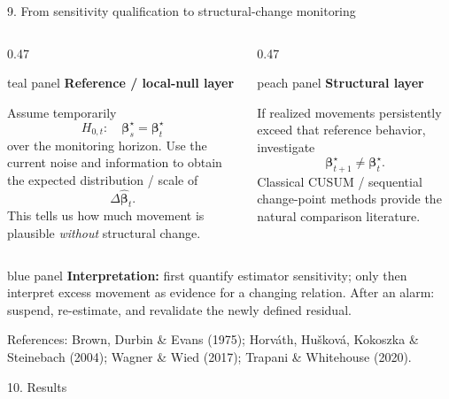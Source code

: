 \documentclass[aspectratio=169,10pt]{beamer}
\newenvironment{tealpanel}{\begin{beamercolorbox}[wd=\linewidth,sep=0.16cm,rounded=true]{teal panel}}{\end{beamercolorbox}}
\newenvironment{peachpanel}{\begin{beamercolorbox}[wd=\linewidth,sep=0.16cm,rounded=true]{peach panel}}{\end{beamercolorbox}}
\newenvironment{bluepanel}{\begin{beamercolorbox}[wd=\linewidth,sep=0.16cm,rounded=true]{blue panel}}{\end{beamercolorbox}}
\newcommand{\plotblank}[2][]{%
  \vspace{0.06cm}
  {\color{linegray}\setlength{\fboxsep}{0pt}\setlength{\fboxrule}{0.45pt}%
  \fbox{\parbox[c][#2][c]{0.985\linewidth}{\centering\color{linegray}\scriptsize #1}}}%
}
\begin{document}
\begin{frame}{9. From sensitivity qualification to structural-change monitoring}
\scriptsize
\begin{columns}[T,onlytextwidth]
\begin{column}{0.47\textwidth}
\begin{tealpanel}
\textbf{Reference / local-null layer}

Assume temporarily
\[
H_{0,t}:\quad \bm\beta_s^{\star}=\bm\beta_t^{\star}
\]
over the monitoring horizon. Use the current noise and information to obtain the expected distribution / scale of
\[
\Delta\hat{\bm\beta}_t.
\]
This tells us how much movement is plausible \emph{without} structural change.
\end{tealpanel}
\end{column}

\begin{column}{0.47\textwidth}
\begin{peachpanel}
\textbf{Structural layer}

If realized movements persistently exceed that reference behavior, investigate
\[
\bm\beta_{t+1}^{\star}\neq\bm\beta_t^{\star}.
\]
Classical CUSUM / sequential change-point methods provide the natural comparison literature.
\end{peachpanel}
\end{column}
\end{columns}

\vspace{0.14cm}
\begin{bluepanel}
\centering
\textbf{Interpretation:} first quantify estimator sensitivity; only then interpret excess movement as evidence for a changing relation. After an alarm: suspend, re-estimate, and revalidate the newly defined residual.
\end{bluepanel}

\vspace{0.10cm}
{\color{textgray}\fontsize{5.4}{6.1}\selectfont References: Brown, Durbin \& Evans (1975); Horv\'ath, Hu\v{s}kov\'a, Kokoszka \& Steinebach (2004); Wagner \& Wied (2017); Trapani \& Whitehouse (2020).}
\end{frame}

\begin{frame}{10. Results}
\vspace{0.28cm}
\plotblank[]{5.95cm}
\end{frame}
\end{document}
